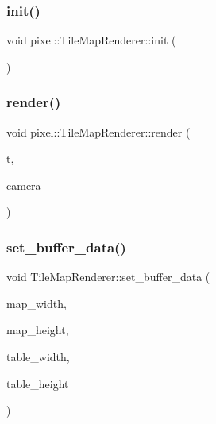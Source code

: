 \subsubsection{\texorpdfstring{init()}{init()}}
{\footnotesize\ttfamily void pixel\+::\+Tile\+Map\+Renderer\+::init (\begin{DoxyParamCaption}{ }\end{DoxyParamCaption})\hspace{0.3cm}{\ttfamily [private]}}

\mbox{\label{classpixel_1_1_tile_map_renderer_ab45a26de69452d0d14c94180381f2837}} 
\subsubsection{\texorpdfstring{render()}{render()}}
{\footnotesize\ttfamily void pixel\+::\+Tile\+Map\+Renderer\+::render (\begin{DoxyParamCaption}\item[{\hyperlink{classpixel_1_1_tile_map}{pixel\+::\+Tile\+Map} \&}]{t,  }\item[{\hyperlink{classpixel_1_1graphics_1_1_camera}{Camera} \&}]{camera }\end{DoxyParamCaption})}

\mbox{\label{classpixel_1_1_tile_map_renderer_a4cac61173817988144b56d0b56304bb4}} 
\subsubsection{\texorpdfstring{set\+\_\+buffer\+\_\+data()}{set\_buffer\_data()}}
{\footnotesize\ttfamily void Tile\+Map\+Renderer\+::set\+\_\+buffer\+\_\+data (\begin{DoxyParamCaption}\item[{float}]{map\+\_\+width,  }\item[{float}]{map\+\_\+height,  }\item[{float}]{table\+\_\+width,  }\item[{float}]{table\+\_\+height }\end{DoxyParamCaption})\hspace{0.3cm}{\ttfamily [private]}}


